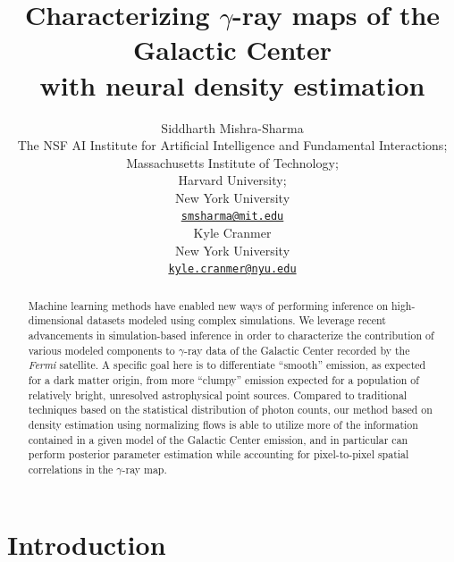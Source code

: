 \documentclass[]{article}
\title{Characterizing $\gamma$-ray maps of the Galactic Center \\ with neural density estimation}
\author{
Siddharth Mishra-Sharma \\
The NSF AI Institute for Artificial Intelligence and Fundamental Interactions; \\
Massachusetts Institute of Technology; \\
Harvard University; \\ 
New York University \\
\href{mailto:smsharma@mit.edu}{\texttt{smsharma@mit.edu}} \\
\And
Kyle Cranmer \\
New York University \\
\href{mailto:kyle.cranmer@nyu.edu}{\texttt{kyle.cranmer@nyu.edu}} \\

}
\newcommand{\Fermi}{\emph{Fermi}\xspace}
\begin{document}
\maketitle

\begin{abstract}
Machine learning methods have enabled new ways of performing inference on high-dimensional datasets modeled using complex simulations. We leverage recent advancements in simulation-based inference in order to characterize the contribution of various modeled components to $\gamma$-ray data of the Galactic Center recorded by the \Fermi satellite. A specific goal here is to differentiate ``smooth'' emission, as expected for a dark matter origin, from more ``clumpy'' emission expected for a population of relatively bright, unresolved astrophysical point sources. Compared to traditional techniques based on the statistical distribution of photon counts, our method based on density estimation using normalizing flows is able to utilize more of the information contained in a given model of the Galactic Center emission, and in particular can perform posterior parameter estimation while accounting for pixel-to-pixel spatial correlations in the $\gamma$-ray map. 

\end{abstract}

\section{Introduction}
\label{sec:intro}
\end{document}
